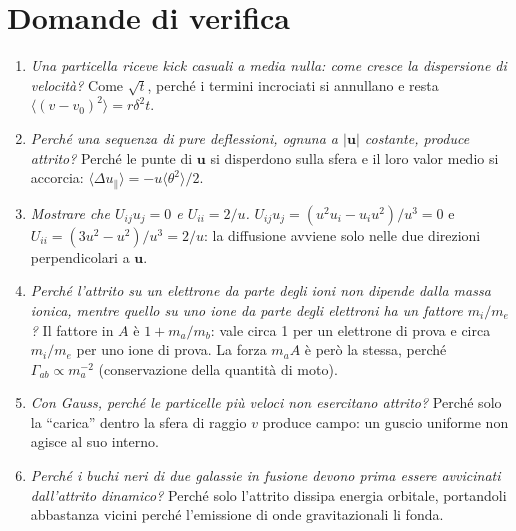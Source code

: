 \section{Domande di verifica}
\begin{enumerate}
\item \textit{Una particella riceve kick casuali a media nulla: come cresce la dispersione di velocità?} Come $\sqrt{t}$, perché i termini incrociati si annullano e resta $\langle(v-v_0)^2\rangle=r\delta^2t$.
\item \textit{Perché una sequenza di pure deflessioni, ognuna a $|\mathbf{u}|$ costante, produce attrito?} Perché le punte di $\mathbf{u}$ si disperdono sulla sfera e il loro valor medio si accorcia: $\langle\Delta u_\parallel\rangle=-u\langle\theta^2\rangle/2$.
\item \textit{Mostrare che $U_{ij}u_j=0$ e $U_{ii}=2/u$.} $U_{ij}u_j=(u^2u_i-u_iu^2)/u^3=0$ e $U_{ii}=(3u^2-u^2)/u^3=2/u$: la diffusione avviene solo nelle due direzioni perpendicolari a $\mathbf{u}$.
\item \textit{Perché l'attrito su un elettrone da parte degli ioni non dipende dalla massa ionica, mentre quello su uno ione da parte degli elettroni ha un fattore $m_i/m_e$?} Il fattore in $A$ è $1+m_a/m_b$: vale circa 1 per un elettrone di prova e circa $m_i/m_e$ per uno ione di prova. La forza $m_aA$ è però la stessa, perché $\Gamma_{ab}\propto m_a^{-2}$ (conservazione della quantità di moto).
\item \textit{Con Gauss, perché le particelle più veloci non esercitano attrito?} Perché solo la ``carica'' dentro la sfera di raggio $v$ produce campo: un guscio uniforme non agisce al suo interno.
\item \textit{Perché i buchi neri di due galassie in fusione devono prima essere avvicinati dall'attrito dinamico?} Perché solo l'attrito dissipa energia orbitale, portandoli abbastanza vicini perché l'emissione di onde gravitazionali li fonda.
\end{enumerate}

